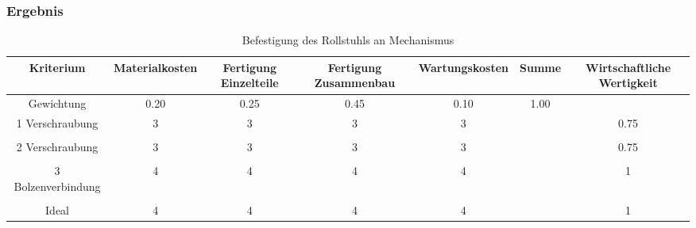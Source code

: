 \documentclass[10pt,a4paper]{article}
\begin{document}
\subsubsection{Ergebnis}
\begin{table}[h]
    \centering
    \begin{tabular}{ccccccc}
        \toprule
        \textbf{Kriterium} & \textbf{Materialkosten} & \textbf{Fertigung Einzelteile} & \textbf{Fertigung Zusammenbau} & \textbf{Wartungskosten} & \textbf{Summe} & \textbf{Wirtschaftliche Wertigkeit} \\
        \midrule
        Gewichtung         & 0.20                    & 0.25                           & 0.45                           & 0.10                    & 1.00           &                                     \\
        \midrule
        1 Verschraubung    & 3                       & 3                              & 3                              & 3                       &                & 0.75                                \\
                           &                         &                                &                                &                         &                &                                     \\
        2 Verschraubung    & 3                       & 3                              & 3                              & 3                       &                & 0.75                                \\
                           &                         &                                &                                &                         &                &                                     \\
        3 Bolzenverbindung & 4                       & 4                              & 4                              & 4                       &                & 1                                   \\
                           &                         &                                &                                &                         &                &                                     \\
        Ideal              & 4                       & 4                              & 4                              & 4                       &                & 1                                   \\
        \bottomrule
    \end{tabular}
    \caption{Befestigung des Rollstuhls an Mechanismus}
    \label{tab:befestigung}
\end{table}
\end{document}
